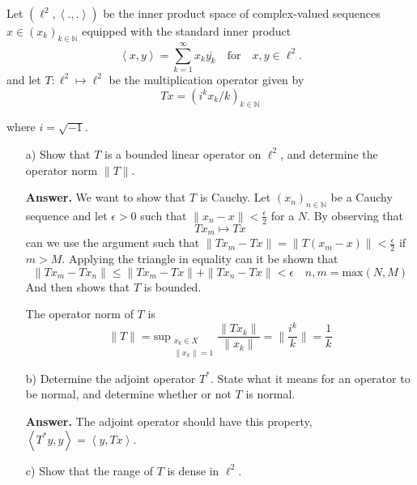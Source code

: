 \documentclass{article}
\theoremstyle{remark}
\begin{document}
Let $\left( \ell^{2}, \left<.,. \right> \right)$ be the inner product space of complex-valued sequences $x \in \left( x_{k} \right)_{k \in \mathbb{N}}$ equipped with the standard inner product 
\begin{equation}
\label{eq:3a}
\left<x,y \right> = \sum_{k=1}^{\infty} x_k \overline{y_k}  \quad \text{for} \quad  x,y \in \ell^{2}.
\end{equation}
and let $T: \ell^{2} \mapsto \ell^{2}$ be the multiplication operator given by \[
Tx = \left( i^{k} x_{k}/k \right)_{k \in \mathbb{N}}
\] 

where $i =\sqrt{-1} $.

\begin{enumerate}
  \item[a)] Show that $T $  is a bounded linear operator on $\ell^{2}$, and determine the operator norm $\|T\|$. 
    \begin{tcolorbox}
      \textbf{Answer.} 
      We want to show that $T$ is Cauchy. Let $\left( x_n \right)_{n \in \mathbb{N}}$ be a Cauchy sequence and let $\epsilon > 0$ such that $\| x_{n} - x\|< \frac{\epsilon}{2}$ for a $N$. By observing that \[
      Tx_{m} \mapsto Tx
      \] 
      can we use the argument such that $\|Tx_{m} - Tx\| = \|T\left( x_{m} - x \right)\| < \frac{\epsilon}{2} $ if $m > M$. Applying the triangle in equality can it be shown that \[
        \|Tx_{m} - Tx_{n}\| \le \|Tx_{m} - Tx\| + \|Tx_{n} - Tx\| < \epsilon \quad n,m = \text{max}\left( N,M \right)
      \]  
      And then shows that $T$ is bounded.
       \par
      The operator norm of $T$  is \[
      \|T\| = \text{sup}_{\substack{x_{k} \in X \\ \|x_{k}\| = 1} }  \frac{\|Tx_{k}\|}{\|x_{k}\|} = \|\frac{i^{k}}{k}\| = \frac{1}{k}
      \] 
    \end{tcolorbox}
  \item[b)] Determine the adjoint operator $T^{*}$. State what it means for an operator to be normal, and determine whether or not $T$ is normal. 
    \begin{tcolorbox}
      \textbf{Answer.} The adjoint operator should have this property, $\left<T^{*}y, y \right> = \left<y,Tx \right>$. 
    \end{tcolorbox}
  \item[c)] Show that the range of $T$ is dense in $\ell^{2}$. 


\end{enumerate}
\end{document}
